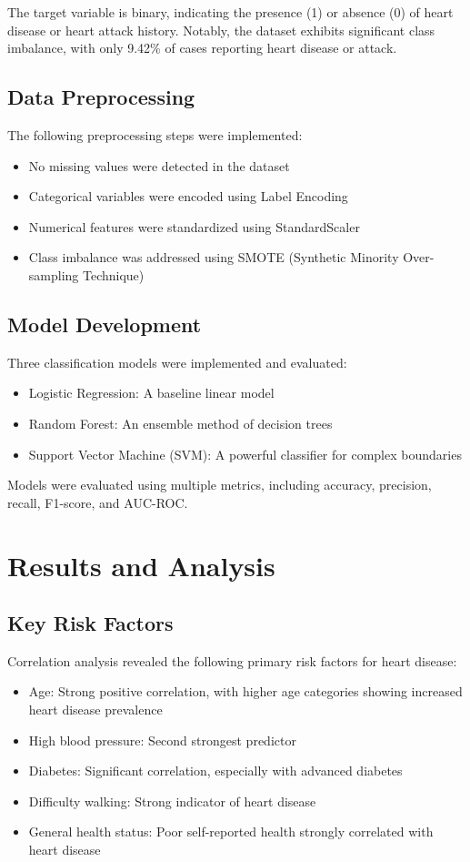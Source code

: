 \documentclass[conference]{IEEEtran}
\begin{document}
The target variable is binary, indicating the presence (1) or absence (0) of heart disease or heart attack history. Notably, the dataset exhibits significant class imbalance, with only 9.42\% of cases reporting heart disease or attack.

\subsection{Data Preprocessing}
The following preprocessing steps were implemented:
\begin{itemize}
    \item No missing values were detected in the dataset
    \item Categorical variables were encoded using Label Encoding
    \item Numerical features were standardized using StandardScaler
    \item Class imbalance was addressed using SMOTE (Synthetic Minority Over-sampling Technique)
\end{itemize}

\subsection{Model Development}
Three classification models were implemented and evaluated:
\begin{itemize}
    \item Logistic Regression: A baseline linear model
    \item Random Forest: An ensemble method of decision trees
    \item Support Vector Machine (SVM): A powerful classifier for complex boundaries
\end{itemize}

Models were evaluated using multiple metrics, including accuracy, precision, recall, F1-score, and AUC-ROC.

\section{Results and Analysis}

\subsection{Key Risk Factors}
Correlation analysis revealed the following primary risk factors for heart disease:
\begin{itemize}
    \item Age: Strong positive correlation, with higher age categories showing increased heart disease prevalence
    \item High blood pressure: Second strongest predictor
    \item Diabetes: Significant correlation, especially with advanced diabetes
    \item Difficulty walking: Strong indicator of heart disease
    \item General health status: Poor self-reported health strongly correlated with heart disease
\end{itemize}
\end{document}
